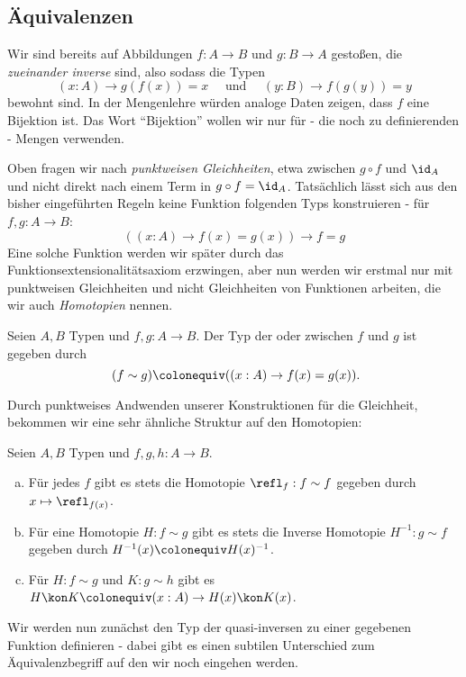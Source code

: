 \subsection{Äquivalenzen}

Wir sind bereits auf Abbildungen $f:A\to B$ und $g:B\to A$ gestoßen, die \emph{zueinander inverse} sind, also sodass die Typen
\[
  (x:A)\to g(f(x))=x\quad \text{ und }\quad (y:B)\to f(g(y))=y 
\]
bewohnt sind.
In der Mengenlehre würden analoge Daten zeigen, dass $f$ eine Bijektion ist.
Das Wort ``Bijektion'' wollen wir nur für - die noch zu definierenden - Mengen verwenden.

Oben fragen wir nach \emph{punktweisen Gleichheiten}, etwa zwischen $g\circ f$ und $\id_A$ und
nicht direkt nach einem Term in $g\circ f = \id_A$.
Tatsächlich lässt sich aus den bisher eingeführten Regeln keine Funktion folgenden Typs konstruieren - für $f,g:A\to B$:
\[
  ((x:A)\to f(x)=g(x))\to f=g
\]
Eine solche Funktion werden wir später durch das Funktionsextensionalitätsaxiom erzwingen,
aber nun werden wir erstmal nur mit punktweisen Gleichheiten und nicht Gleichheiten von Funktionen arbeiten, die wir auch \emph{Homotopien} nennen.

\begin{definition}
  Seien $A,B$ Typen und $f,g:A\to B$.
  Der Typ der 
  oder  zwischen $f$ und $g$
  ist gegeben durch
  \[
    (f\sim g)\colonequiv( (x:A)\to f(x)=g(x))\rlap{.}
  \]
\end{definition}

Durch punktweises Andwenden unserer Konstruktionen für die Gleichheit,
bekommen wir eine sehr ähnliche Struktur auf den Homotopien:

\begin{definition}
  Seien $A,B$ Typen und $f,g,h:A\to B$.
  \begin{enumerate}[(a)]
  \item Für jedes $f$ gibt es stets die Homotopie $\refl_f:f\sim f$ gegeben durch $x\mapsto \refl_{f(x)}$.
  \item Für eine Homotopie $H:f\sim g$ gibt es stets die Inverse Homotopie $H^{-1}:g\sim f$ gegeben durch $H^{-1}(x)\colonequiv H(x)^{-1}$.
  \item Für $H:f\sim g$ und $K:g\sim h$ gibt es $H\kon K\colonequiv (x:A)\to H(x)\kon K(x)$.
  \end{enumerate}
\end{definition}

Wir werden nun zunächst den Typ der quasi-inversen zu einer gegebenen Funktion definieren
- dabei gibt es einen subtilen Unterschied zum Äquivalenzbegriff auf den wir noch eingehen werden.

